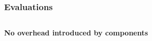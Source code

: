 \documentclass{beamer}
\begin{document}
\begin{frame}
\frametitle{Evaluations}
\begin{columns}
\begin{column}{6cm}
\end{column}
\begin{column}{6cm}
\end{column}
\end{columns}
\begin{center}
\textbf{No overhead introduced by components}
\end{center}
\end{frame}
\end{document}
